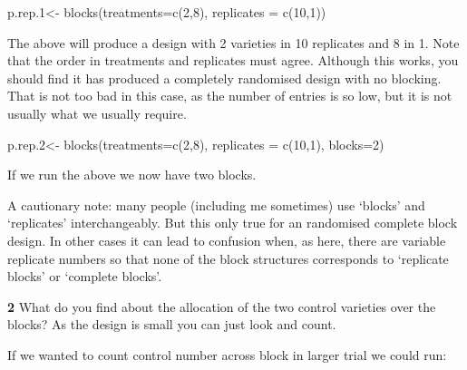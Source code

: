 \documentclass[
]{book}
\makeatletter
\newenvironment{Shaded}{\begin{snugshade}}{\end{snugshade}}
\newcommand{\AttributeTok}[1]{\textcolor[rgb]{0.77,0.63,0.00}{#1}}
\newcommand{\DecValTok}[1]{\textcolor[rgb]{0.00,0.00,0.81}{#1}}
\newcommand{\FloatTok}[1]{\textcolor[rgb]{0.00,0.00,0.81}{#1}}
\newcommand{\FunctionTok}[1]{\textcolor[rgb]{0.00,0.00,0.00}{#1}}
\newcommand{\NormalTok}[1]{#1}
\newcommand{\OtherTok}[1]{\textcolor[rgb]{0.56,0.35,0.01}{#1}}
\newenvironment{kframe}{%
\medskip{}
\setlength{\fboxsep}{.8em}
 \def\at@end@of@kframe{}%
 \ifinner\ifhmode%
  \def\at@end@of@kframe{\end{minipage}}%
  \begin{minipage}{\columnwidth}%
 \fi\fi%
 \def\FrameCommand##1{\hskip\@totalleftmargin \hskip-\fboxsep
 \colorbox{shadecolor}{##1}\hskip-\fboxsep
     \hskip-\linewidth \hskip-\@totalleftmargin \hskip\columnwidth}%
 \MakeFramed {\advance\hsize-\width
   \@totalleftmargin\z@ \linewidth\hsize
   \@setminipage}}%
 {\par\unskip\endMakeFramed%
 \at@end@of@kframe}
\newenvironment{rmdblock}[1]
  {
  \begin{itemize}
  \renewcommand{\labelitemi}{
    \raisebox{-.7\height}[0pt][0pt]{
      {\setkeys{Gin}{width=3em,keepaspectratio}\texttt{[image: images/\#1]}}
    }
  }
  \setlength{\fboxsep}{1em}
  \begin{kframe}
  \item
  }
  {
  \end{kframe}
  \end{itemize}
  }
\newenvironment{rmdquiz}
  {\begin{rmdblock}{quiz}}
  {\end{rmdblock}}
\newenvironment{rmdcaution}
  {\begin{rmdblock}{caution}}
  {\end{rmdblock}}
\makeatother
\begin{document}
\begin{Shaded}
\begin{Highlighting}[]
\NormalTok{p.rep}\FloatTok{.1}\OtherTok{\textless{}{-}} \FunctionTok{blocks}\NormalTok{(}\AttributeTok{treatments=}\FunctionTok{c}\NormalTok{(}\DecValTok{2}\NormalTok{,}\DecValTok{8}\NormalTok{), }\AttributeTok{replicates =} \FunctionTok{c}\NormalTok{(}\DecValTok{10}\NormalTok{,}\DecValTok{1}\NormalTok{))}
\end{Highlighting}
\end{Shaded}

The above will produce a design with 2 varieties in 10 replicates and 8 in 1. Note that the order in treatments and replicates must agree. Although this works, you should find it has produced a completely randomised design with no blocking. That is not too bad in this case, as the number of entries is so low, but it is not usually what we usually require.

\begin{Shaded}
\begin{Highlighting}[]
\NormalTok{p.rep}\FloatTok{.2}\OtherTok{\textless{}{-}} \FunctionTok{blocks}\NormalTok{(}\AttributeTok{treatments=}\FunctionTok{c}\NormalTok{(}\DecValTok{2}\NormalTok{,}\DecValTok{8}\NormalTok{), }\AttributeTok{replicates =} \FunctionTok{c}\NormalTok{(}\DecValTok{10}\NormalTok{,}\DecValTok{1}\NormalTok{), }\AttributeTok{blocks=}\DecValTok{2}\NormalTok{)}
\end{Highlighting}
\end{Shaded}

If we run the above we now have two blocks.

\begin{rmdcaution}
A cautionary note: many people (including me sometimes) use `blocks' and `replicates' interchangeably. But this only true for an randomised complete block design. In other cases it can lead to confusion when, as here, there are variable replicate numbers so that none of the block structures corresponds to `replicate blocks' or `complete blocks'.
\end{rmdcaution}

\begin{rmdquiz}
\textbf{2} What do you find about the allocation of the two control varieties over the blocks? As the design is small you can just look and count.
\end{rmdquiz}

If we wanted to count control number across block in larger trial we could run:
\end{document}
